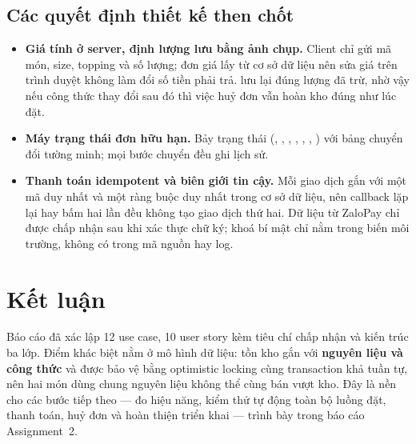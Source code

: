 ﻿\documentclass[12pt,a4paper]{article}
\begin{document}
\subsection{Các quyết định thiết kế then chốt}
\begin{itemize}
  \item \textbf{Giá tính ở server, định lượng lưu bằng ảnh chụp.} Client chỉ gửi mã món, size, topping
        và số lượng; đơn giá lấy từ cơ sở dữ liệu nên sửa giá trên trình duyệt không làm đổi số tiền
        phải trả.  lưu lại đúng lượng đã trừ, nhờ vậy nếu công thức thay đổi sau
        đó thì việc huỷ đơn vẫn hoàn kho đúng như lúc đặt.
  \item \textbf{Máy trạng thái đơn hữu hạn.} Bảy trạng thái (, ,
        , , , , ) với bảng
        chuyển đổi tường minh; mọi bước chuyển đều ghi lịch sử.
  \item \textbf{Thanh toán idempotent và biên giới tin cậy.} Mỗi giao dịch gắn với một mã duy nhất
        và một ràng buộc duy nhất trong cơ sở dữ liệu, nên callback lặp lại hay bấm hai lần đều không
        tạo giao dịch thứ hai. Dữ liệu từ ZaloPay chỉ được chấp nhận sau khi xác thực chữ ký; khoá bí
        mật chỉ nằm trong biến môi trường, không có trong mã nguồn hay log.
\end{itemize}

\section{Kết luận}
Báo cáo đã xác lập 12 use case, 10 user story kèm tiêu chí chấp nhận và kiến trúc ba lớp. Điểm khác
biệt nằm ở mô hình dữ liệu: tồn kho gắn với \textbf{nguyên liệu và công thức} và được bảo vệ bằng
optimistic locking cùng transaction khả tuần tự, nên hai món dùng chung nguyên liệu không thể cùng
bán vượt kho. Đây là nền cho các bước tiếp theo --- đo hiệu năng, kiểm thử tự động toàn bộ luồng đặt,
thanh toán, huỷ đơn và hoàn thiện triển khai --- trình bày trong báo cáo Assignment~2.
\end{document}
